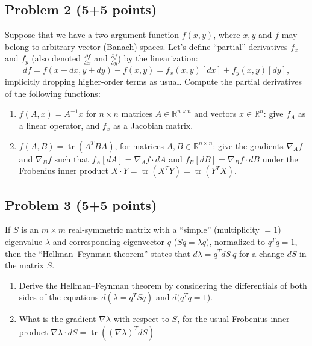 \documentclass{article}
\newcommand{\tr}{\operatorname{tr}}
\begin{document}
\subsection*{Problem 2 (5+5 points)}

Suppose that we have a two-argument function $f(x,y)$, where $x,y$
and $f$ may belong to arbitrary vector (Banach) spaces. Let's define
``partial'' derivatives $f_{x}$ and $f_{y}$ (also denoted $\frac{\partial f}{\partial x}$
and $\frac{\partial f}{\partial y}$) by the linearization: 
\[
df=f(x+dx,y+dy)-f(x,y)=f_{x}(x,y)[dx]+f_{y}(x,y)[dy],
\]
implicitly dropping higher-order terms as usual. Compute the partial
derivatives of the following functions:
\begin{enumerate}
\item $f(A,x)=A^{-1}x$ for $n\times n$ matrices $A\in\mathbb{R}^{n\times n}$
and vectors $x\in\mathbb{R}^{n}$: give $f_{A}$ as a linear operator,
and $f_{x}$ as a Jacobian matrix.
\item $f(A,B)=\tr(A^{T}BA)$, for matrices $A,B\in\mathbb{R}^{n\times n}$:
give the gradients $\nabla_{A}f$ and $\nabla_{B}f$ such that $f_{A}[dA]=\nabla_{A}f\cdot dA$
and $f_{B}[dB]=\nabla_{B}f\cdot dB$ under the Frobenius inner product
$X\cdot Y=\tr(X^{T}Y)=\tr(Y^{T}X)$.
\end{enumerate}

\subsection*{Problem 3 (5+5 points)}

If $S$ is an $m\times m$ real-symmetric matrix with a ``simple''
(multiplicity $=1$) eigenvalue $\lambda$ and corresponding eigenvector
$q$ ($Sq=\lambda q)$, normalized to $q^{T}q=1$, then the ``Hellman--Feynman
theorem'' states that 
$d\lambda=q^{T}dS\:q$
 for a change $dS$ in the matrix $S$.
\begin{enumerate}
\item Derive the Hellman--Feynman theorem by considering the differentials
of both sides of the equations $d(\lambda=q^{T}Sq)$ and $d(q^{T}q=1$).
\item What is the gradient $\nabla\lambda$ with respect to $S$, for the
usual Frobenius inner product $\nabla\lambda\cdot 
dS=\tr((\nabla\lambda)^{T}dS)$


\end{enumerate}
\end{document}
